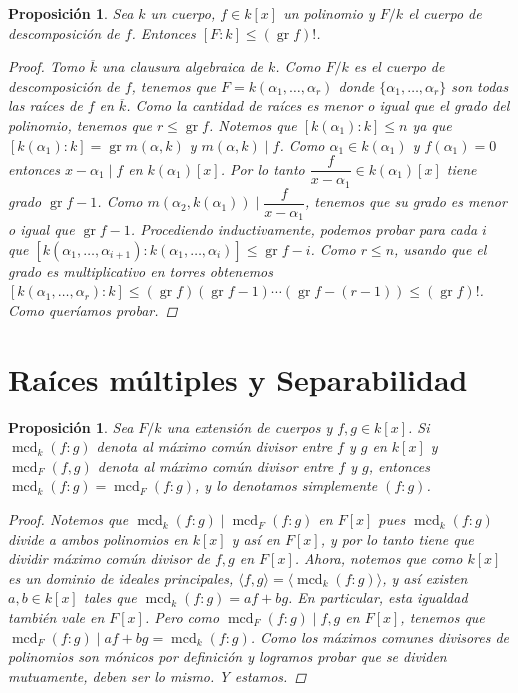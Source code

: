 \documentclass[12pt]{book}
\newtheorem{prop}[teo]{Proposición}
\theoremstyle{definition}
\DeclareMathOperator{\mcd}{mcd}
\DeclareMathOperator{\gr}{gr}
\begin{document}
\begin{prop}
Sea $k$ un cuerpo, $f\in k[x]$ un polinomio y $F/k$ el cuerpo de descomposición de $f$. Entonces $[F:k]\leq (\gr f)!$.
\begin{proof}
Tomo $\overline{k}$ una clausura algebraica de $k$. Como $F/k$ es el cuerpo de descomposición de $f$, tenemos que $F=k(\alpha_1,\ldots ,\alpha_r)$ donde $\{\alpha_1,\ldots ,\alpha_r\}$ son todas las raíces de $f$ en $\overline{k}$. Como la cantidad de raíces es menor o igual que el grado del polinomio, tenemos que $r\leq \gr f$. Notemos que $[k(\alpha_1):k]\leq n$ ya que $[k(\alpha_1):k]=\gr m(\alpha,k)$ y $m(\alpha,k)\mid f$. Como $\alpha_1\in k(\alpha_1)$ y $f(\alpha_1)=  0$ entonces $x-\alpha_1 \mid f$ en $k(\alpha_1)[x]$. Por lo tanto $\dfrac{f}{x-\alpha_1}\in k(\alpha_1)[x]$ tiene grado $\gr f - 1$. Como $m(\alpha_2, k(\alpha_1))\mid \dfrac{f}{x-\alpha_1}$, tenemos que su grado es menor o igual que $\gr f - 1$. Procediendo inductivamente, podemos probar para cada $i$ que $[k(\alpha_1,\ldots ,\alpha_{i+1}): k(\alpha_1,\ldots ,\alpha_i)]\leq \gr f - i$. Como $r\leq n$, usando que el grado es multiplicativo en torres obtenemos $[k(\alpha_1,\ldots , \alpha_r):k]\leq (\gr f)(\gr f -1)\cdots (\gr f - (r-1))\leq (\gr f)!$. Como queríamos probar.
\end{proof} 
\end{prop}

\section{Raíces múltiples y Separabilidad}

\begin{prop}
Sea $F/k$ una extensión de cuerpos y $f,g\in k[x]$. Si $\mcd_k(f:g)$ denota al máximo común divisor entre $f$ y $g$ en $k[x]$ y $\mcd_F(f,g)$ denota al máximo común divisor entre $f$ y $g$, entonces $\mcd_k(f:g) = \mcd_F(f:g)$, y lo denotamos simplemente $(f:g)$.
\begin{proof}
Notemos que $\mcd_k(f:g)\mid \mcd_F(f:g)$ en $F[x]$ pues $\mcd_k(f:g)$ divide a ambos polinomios en $k[x]$ y así en $F[x]$, y por lo tanto tiene que dividir máximo común divisor de $f,g$ en $F[x]$. Ahora, notemos que como $k[x]$ es un dominio de ideales principales, $\langle f,g\rangle = \langle \mcd_k(f:g)\rangle$, y así existen $a,b\in k[x]$ tales que $\mcd_k(f:g) = af + bg$. En particular, esta igualdad también vale en $F[x]$. Pero como $\mcd_F(f:g)\mid f,g$ en $F[x]$, tenemos que $\mcd_F(f:g)\mid af + bg = \mcd_k(f:g)$. Como los máximos comunes divisores de polinomios son mónicos por definición y logramos probar que se dividen mutuamente, deben ser lo mismo. Y estamos.
\end{proof}
\end{prop}
\end{document}
